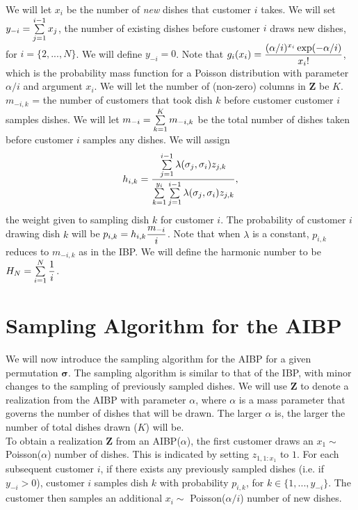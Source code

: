 \noindent
We will let $x_i$ be the number of \textit{new} dishes that customer $i$ takes.
We will set $y_{-i} = \sum\limits_{j=1}^{i-1} x_j$, the number of existing dishes
before customer $i$ draws new dishes, for $i=\{2,...,N\}$. We will define
$y_{-i} = 0$. Note that $g_i(x_i) =
\displaystyle\frac{(\alpha/i)^{x_i}\exp(-\alpha/i)}{x_i!}$, which is the probability mass
function for a Poisson distribution with parameter $\alpha/i$ and argument
$x_i$. We will let the number of (non-zero) columns in $\bm Z$ be $K$.
$m_{-i,k}$ = the number of customers that took dish $k$ before customer
customer $i$ samples dishes. We will let  $m_{-i} = \sum\limits_{k=1}^{K}m_{-i,k}$ be
the total number of dishes taken before customer $i$ samples any dishes.  We
will assign 
\[h_{i,k} = \displaystyle\frac{\sum\limits_{j=1}^{i-1}\lambda(\sigma_j,\sigma_i)z_{j,k}} {\sum\limits_{k=1}^{y_i}\sum\limits_{j=1}^{i-1}\lambda(\sigma_j,\sigma_i)z_{j,k}},\]
the weight given to sampling dish $k$ for
customer $i$. The probability of customer $i$ drawing dish $k$ will be $p_{i,k}
= h_{i,k} \displaystyle\frac{m_{-i}}{i}$. Note that when $\lambda$ is a constant,
$p_{i,k}$ reduces to $m_{-i,k}$ as in the IBP. We will define the harmonic
number to be $H_N = \sum\limits_{i=1}^{N} \displaystyle\frac{1}{i}$.



\section{Sampling Algorithm for the AIBP}
We will now introduce the sampling algorithm for the AIBP for a given
permutation $\bm\sigma$. The sampling algorithm is similar to that of the IBP,
with minor changes to the sampling of previously sampled dishes. We will use 
$\bm Z$ to denote a realization from the AIBP with parameter $\alpha$, where 
$\alpha$ is a mass parameter that governs the number of dishes that will be drawn.
The larger $\alpha$ is, the larger the number of total dishes drawn ($K$) will be.\\

\noindent
To obtain a realization $\bm Z$ from an AIBP($\alpha$), the first customer
draws an $x_1 \sim$ Poisson($\alpha$) number of dishes. This is indicated by
setting $z_{1,1:x_1}$ to $1$. For each subsequent customer $i$, if there exists
any previously sampled dishes (i.e. if $y_{-i}>0$), customer $i$ samples dish
$k$ with probability $p_{i,k}$, for $k \in \{1,...,y_{-i}\}$. The customer then
samples an additional $x_i \sim$ Poisson($\alpha/i$) number of new dishes. 

